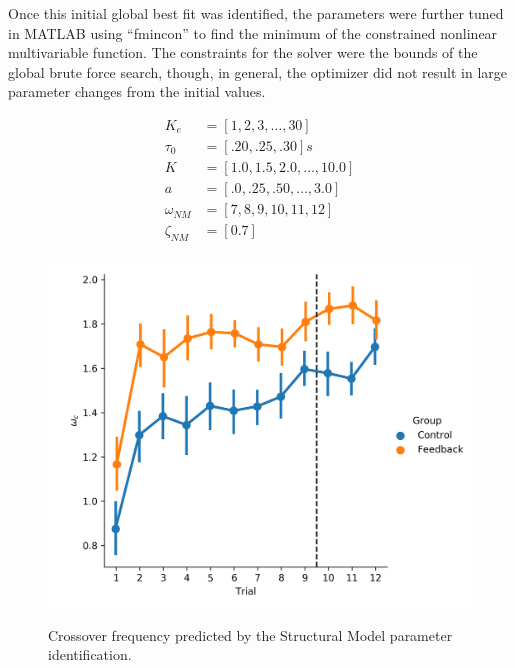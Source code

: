 Once this initial global best fit was identified, the parameters were further tuned in MATLAB using ``fmincon'' to find the minimum of the constrained nonlinear multivariable function.
The constraints for the solver were the bounds of the global brute force search, though, in general, the optimizer did not result in large parameter changes from the initial values.

\begin{align}
    K_e         & = [1, 2, 3, \ldots, 30]         \\
    \tau_0      & = [.20, .25, .30] s             \\
    K           & = [1.0, 1.5, 2.0, \ldots, 10.0] \\
    a           & = [.0, .25, .50, \ldots, 3.0]   \\
    \omega_{NM} & = [7, 8, 9, 10, 11, 12]         \\
    \zeta_{NM}  & = [0.7]                         \\
\end{align}

\begin{figure}[t]
    \centering
    \centering
    \includegraphics[width=0.8\linewidth]{figures/Modeling/wc_group.png}
    \label{fig:sm_crossover}
    \caption[Crossover frequency (Structural Model)]{Crossover frequency predicted by the Structural Model parameter identification.}
\end{figure}


